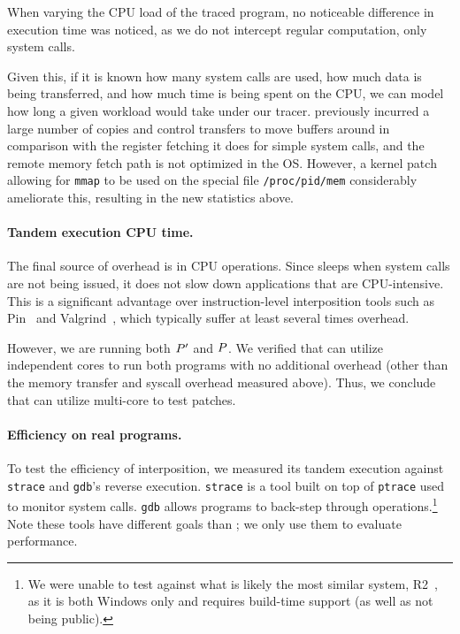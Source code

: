 When varying the CPU load of the traced program, no noticeable difference in execution time was noticed, as we do not intercept regular computation, only system calls.

Given this, if it is known how many system calls are used, how much data is being
transferred, and how much time is being spent on the CPU, we can model how long
a given workload would take under our tracer.
\tachyon previously incurred a large number of copies and control transfers to move buffers around
in comparison with the register fetching it does for simple system calls, and
the remote memory fetch path is not optimized in the OS. However, a kernel patch
allowing for \texttt{mmap} to be used on the special file \texttt{/proc/pid/mem}
considerably ameliorate this, resulting in the new statistics above.

\paragraph{Tandem execution CPU time.}
The final source of overhead is in CPU operations.  Since \tachyon
sleeps when system calls are not being issued, it does not slow down
applications that are CPU-intensive. This is a significant advantage
over instruction-level interposition tools such as Pin~\cite{luk:2005} and
Valgrind~\cite{nethercote:2003:valgrind}, which typically suffer at least several
times overhead.

However, we are running both $P'$ and $P$. We verified
that \tachyon can utilize independent cores to run both programs with
no additional overhead (other than the memory transfer and syscall
overhead measured above). Thus, we conclude that \tachyon can utilize
multi-core to test patches.

\paragraph{Efficiency on real programs.}

To test the efficiency of \tachyon interposition, we measured its
tandem execution against \texttt{strace} and \texttt{gdb}'s reverse
execution.  {\tt strace} is a tool built on top of \texttt{ptrace}
used to monitor system calls.  \texttt{gdb} allows programs to
back-step through operations.\footnote{We were unable to test against
  what is likely the most similar system, R2~\cite{guo:2008}, as it is
  both Windows only and requires build-time support (as well as not
  being public).} Note these tools have different goals than \tachyon;
we only use them to evaluate performance.

